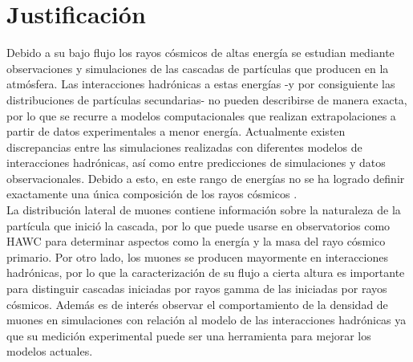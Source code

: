 %

\section{Justificación}
Debido a su bajo flujo los rayos cósmicos de altas energía se estudian mediante observaciones y simulaciones de las cascadas de partículas que producen en la atmósfera. Las interacciones hadr\'onicas a estas energ\'ias -y por consiguiente las distribuciones de part\'iculas secundarias- no pueden describirse de manera exacta, por lo que se recurre a modelos computacionales que realizan extrapolaciones a partir de datos experimentales a menor energ\'ia. Actualmente existen discrepancias entre las simulaciones realizadas con diferentes modelos de interacciones hadrónicas, así como entre predicciones de simulaciones y datos observacionales. Debido a esto, en este rango de energ\'ias no se ha logrado definir exactamente una \'unica composici\'on de los rayos c\'osmicos . \\

La distribuci\'on lateral de muones contiene informaci\'on sobre la naturaleza de la part\'icula que inici\'o la cascada, por lo que puede usarse en observatorios como HAWC para determinar aspectos como la energ\'ia y la masa del rayo c\'osmico primario. Por otro lado, los muones se producen mayormente en interacciones hadr\'onicas, por lo que la caracterizaci\'on de su flujo a cierta altura es importante para distinguir cascadas iniciadas por rayos gamma de las iniciadas por rayos c\'osmicos. Adem\'as es de inter\'es observar el comportamiento de la densidad de muones en simulaciones con relaci\'on al modelo de las interacciones hadr\'onicas ya que su medici\'on experimental puede ser una herramienta para mejorar los modelos actuales.

